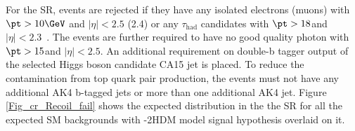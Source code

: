 

For the SR, events are rejected if they have any isolated electrons (muons) with $\pt >10\GeV$ and $|\eta|< 2.5$ (2.4) or 
any $\tau_\mathrm{had}$ candidates with $\pt > 18$\GeV and $|\eta|<2.3$~\cite{Khachatryan:2015hwa,Chatrchyan:2013sba,CMSTauJINST}. The events are further required to have no good quality photon with $\pt> 15$\GeV and $|\eta|<2.5$. An additional requirement on double-b tagger output of the selected Higgs boson candidate CA15 jet is placed.
To reduce the contamination from top quark pair production, the events must not have any additional AK4 b-tagged jets or more than one additional AK4 jet.
Figure \ref{Fig_cr_Recoil_fail} shows the expected \MET distribution in the the SR for all the expected SM backgrounds with \cPZpr-2HDM model signal hypothesis overlaid on it. 

